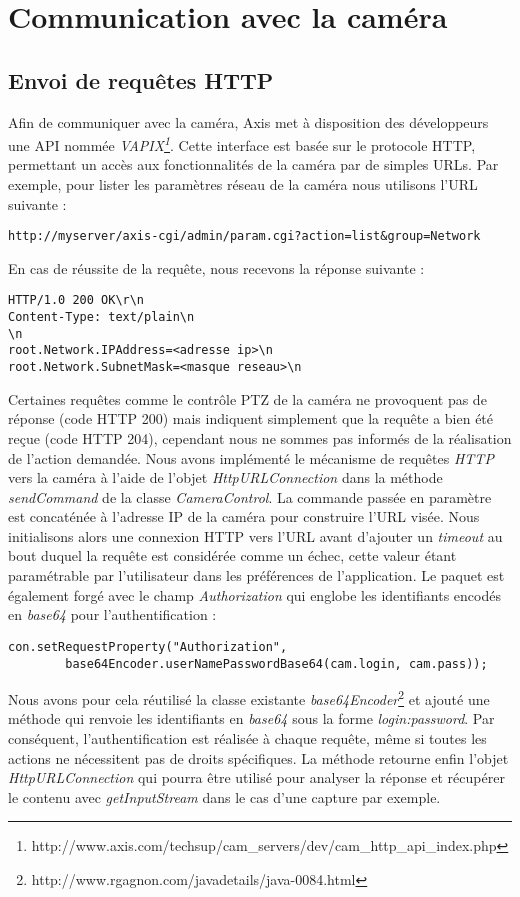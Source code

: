 \section{Communication avec la caméra}
\subsection{Envoi de requêtes HTTP}
Afin de communiquer avec la caméra, Axis met à disposition des développeurs une
API nommée \textit{VAPIX\footnote{\label{vapix}
http://www.axis.com/techsup/cam\_servers/dev/cam\_http\_api\_index.php}}. Cette
interface est basée sur le protocole HTTP, permettant un accès aux fonctionnalités de la caméra par de simples URLs. Par exemple, pour lister les paramètres réseau de la caméra nous utilisons l'URL suivante :
\begin{lstlisting}
http://myserver/axis-cgi/admin/param.cgi?action=list&group=Network
\end{lstlisting}
En cas de réussite de la requête, nous recevons la réponse suivante :
\begin{lstlisting}
HTTP/1.0 200 OK\r\n
Content-Type: text/plain\n
\n
root.Network.IPAddress=<adresse ip>\n
root.Network.SubnetMask=<masque reseau>\n
\end{lstlisting}

Certaines requêtes comme le contrôle PTZ de la caméra ne provoquent pas de réponse (code HTTP 200) mais indiquent simplement que la requête a bien été reçue (code HTTP 204), cependant nous ne sommes pas informés de la réalisation de l'action demandée.
Nous avons implémenté le mécanisme de requêtes \textit{HTTP} vers la caméra à l'aide de l'objet \textit{HttpURLConnection} dans la méthode \textit{sendCommand} de la classe \textit{CameraControl}. La commande passée en paramètre est concaténée à l'adresse IP de la caméra pour construire l'URL visée.
Nous initialisons alors une connexion HTTP vers l'URL avant d'ajouter un
\textit{timeout} au bout duquel la requête est considérée comme un échec, cette
valeur étant paramétrable par l'utilisateur dans les préférences de l'application. Le paquet est également forgé avec le champ \textit{Authorization} qui englobe les identifiants encodés en \textit{base64} pour l'authentification :
\begin{lstlisting}
con.setRequestProperty("Authorization",
		base64Encoder.userNamePasswordBase64(cam.login, cam.pass));
\end{lstlisting}
Nous avons pour cela réutilisé la classe existante
\textit{base64Encoder}\footnote{\label{base64}http://www.rgagnon.com/javadetails/java-0084.html}
et ajouté une méthode qui renvoie les identifiants en \textit{base64} sous la forme \textit{login:password}. Par conséquent, l'authentification est réalisée à chaque requête, même si toutes les actions ne nécessitent pas de droits spécifiques. La méthode retourne enfin l'objet \textit{HttpURLConnection} qui pourra être utilisé pour analyser la réponse et récupérer le contenu avec \textit{getInputStream} dans le cas d'une capture par exemple.

